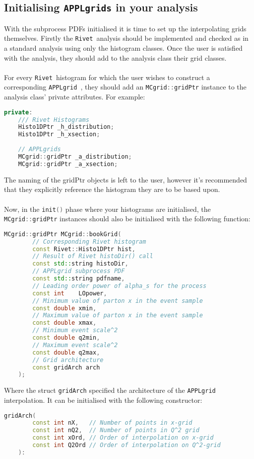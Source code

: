 \documentclass[11pt]{article}
\newcommand{\rivet} {{\tt Rivet }}
\newcommand{\appl} {{\tt APPLgrid }}
\begin{document}
\subsection{Initialising {\tt APPLgrids} in your analysis}
With the subprocess PDFs initialised it is time to set up the interpolating grids themselves. Firstly the \rivet analysis should be implemented and checked as in a standard analysis using only the histogram classes. Once the user is satisfied with the analysis, they should add to the analysis class
their grid classes. \\\\
For every \rivet histogram for which the user wishes to construct a corresponding \appl, they should add an \lstinline[language=c++]{MCgrid::gridPtr} instance to the analysis class' private attributes. For example:
\clearpage
\begin{lstlisting}[language=c++]
 private:
    /// Rivet Histograms
    Histo1DPtr _h_distribution;
    Histo1DPtr _h_xsection;
    
    // APPLgrids
    MCgrid::gridPtr _a_distribution;
    MCgrid::gridPtr _a_xsection;
\end{lstlisting}
 The naming of the gridPtr objects is left to the user, however it's recommended that they explicitly reference the histogram they are to be based upon.\\\\
 Now, in the \lstinline[language=c++]{init()} phase where your histograms are initialised, the \lstinline[language=c++]{MCgrid::gridPtr} instances should also be initialised with the following function:
 
  \begin{lstlisting}[language=c++]
	MCgrid::gridPtr MCgrid::bookGrid( 
		// Corresponding Rivet histogram
		const Rivet::Histo1DPtr hist,      
		// Result of Rivet histoDir() call
		const std::string histoDir,        
		// APPLgrid subprocess PDF   
		const std::string pdfname,    
		// Leading order power of alpha_s for the process
		const int    LOpower,               
		// Minimum value of parton x in the event sample      
		const double xmin,                   
		// Maximum value of parton x in the event sample
		const double xmax,        
		// Minimum event scale^2           
		const double q2min,          
		// Maximum event scale^2       
		const double q2max,            
		// Grid architecture    
		const gridArch arch   
	);   
\end{lstlisting}

Where the struct \lstinline[language=c++]{gridArch} specified the architecture of the \appl interpolation. It can be initialised with the following constructor:
  \clearpage
  \begin{lstlisting}[language=c++]
	gridArch( 
		const int nX, 	// Number of points in x-grid
		const int nQ2,	// Number of points in Q^2 grid
		const int xOrd,	// Order of interpolation on x-grid
		const int Q2Ord // Order of interpolation on Q^2-grid
	):
 \end{lstlisting}
\end{document}
